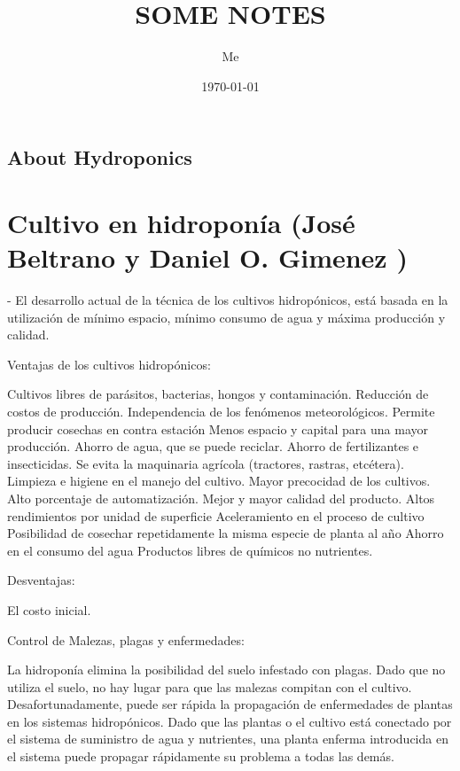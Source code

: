 \documentclass{report}
\title{SOME NOTES}
\author{Me}
\date{\today}
\begin{document}
\section{About Hydroponics}

\chapter{Cultivo en hidroponía (José Beltrano y Daniel O. Gimenez )}

- El desarrollo actual de la técnica de los cultivos hidropónicos, está basada
en la utilización de mínimo espacio, mínimo consumo de agua y máxima producción
y calidad.

Ventajas de los cultivos hidropónicos:

Cultivos libres de parásitos, bacterias, hongos y contaminación.
Reducción de costos de producción.
Independencia de los fenómenos meteorológicos.
Permite producir cosechas en contra estación
Menos espacio y capital para una mayor producción.
Ahorro de agua, que se puede reciclar.
Ahorro de fertilizantes e insecticidas.
Se evita la maquinaria agrícola (tractores, rastras, etcétera).
Limpieza e higiene en el manejo del cultivo.
Mayor precocidad de los cultivos.
Alto porcentaje de automatización.
Mejor y mayor calidad del producto.
Altos rendimientos por unidad de superficie
Aceleramiento en el proceso de cultivo
Posibilidad de cosechar repetidamente la misma especie de planta al año
Ahorro en el consumo del agua
Productos libres de químicos no nutrientes.

Desventajas:

El costo inicial.

Control de Malezas, plagas y enfermedades:

La hidroponía elimina la posibilidad del suelo infestado con plagas. Dado que no utiliza
el suelo, no hay lugar para que las malezas compitan con el cultivo. Desafortunadamente,
puede ser rápida la propagación de enfermedades de plantas en los sistemas hidropónicos.
Dado que las plantas o el cultivo está conectado por el sistema de suministro de agua y
nutrientes, una planta enferma introducida en el sistema puede propagar rápidamente su
problema a todas las demás.
\end{document}
